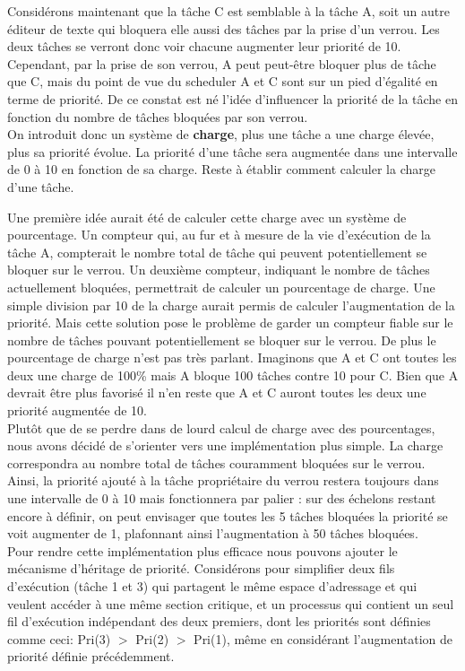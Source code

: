 Considérons maintenant que la tâche C est semblable à la tâche A, soit un autre éditeur de texte qui bloquera elle aussi des tâches par la prise d'un verrou. Les deux tâches se verront donc voir chacune augmenter leur priorité de 10. Cependant, par la prise de son verrou, A peut peut-être bloquer plus de tâche que C, mais du point de vue du scheduler A et C sont sur un pied d'égalité en terme de priorité. De ce constat est né l'idée d'influencer la priorité de la tâche en fonction du nombre de tâches bloquées par son verrou. 
\\

On introduit donc un système de \textbf{charge}, plus une tâche a une charge élevée, plus sa priorité évolue. La priorité d'une tâche sera augmentée dans une intervalle de 0 à 10 en fonction de sa charge. Reste à établir comment calculer la charge d'une tâche. 

Une première idée aurait été de calculer cette charge avec un système de pourcentage. Un compteur qui, au fur et à mesure de la vie d'exécution de la tâche A, compterait le nombre total de tâche qui peuvent potentiellement se bloquer sur le verrou. Un deuxième compteur, indiquant le nombre de tâches actuellement bloquées, permettrait de calculer un pourcentage de charge. Une simple division par 10 de la charge aurait permis de calculer l'augmentation de la priorité. Mais cette solution pose le problème de garder un compteur fiable sur le nombre de tâches pouvant potentiellement se bloquer sur le verrou. De plus le pourcentage de charge n'est pas très parlant. Imaginons que A et C ont toutes les deux une charge de 100\% mais A bloque 100 tâches contre 10 pour C. Bien que A devrait être plus favorisé il n'en reste que A et C auront toutes les deux une priorité augmentée de 10.
\\

Plutôt que de se perdre dans de lourd calcul de charge avec des pourcentages, nous avons décidé de s'orienter vers une implémentation plus simple. La charge correspondra au nombre total de tâches couramment bloquées sur le verrou. Ainsi, la priorité ajouté à la tâche propriétaire du verrou restera toujours dans une intervalle de 0 à 10 mais fonctionnera par palier : sur des échelons restant encore à définir, on peut envisager que toutes les 5 tâches bloquées la priorité se voit augmenter de 1, plafonnant ainsi l'augmentation à 50 tâches bloquées.
\\

Pour rendre cette implémentation plus efficace nous pouvons ajouter le
mécanisme d'héritage de priorité. Considérons pour simplifier deux fils d'exécution
(tâche 1 et 3) qui partagent le même espace d'adressage et qui veulent accéder à une même section critique, et un processus qui contient un seul fil d'exécution indépendant des deux 
premiers, dont les priorités sont définies comme ceci: Pri(3) $>$ Pri(2) $>$ 
Pri(1), même en considérant l'augmentation de priorité définie précédemment.
\\

